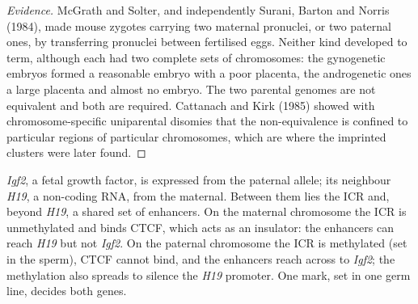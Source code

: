 \begin{proof}[Evidence]
McGrath and Solter, and independently Surani, Barton and Norris (1984),
made mouse zygotes carrying two maternal pronuclei, or two paternal
ones, by transferring pronuclei between fertilised eggs. Neither kind
developed to term, although each had two complete sets of chromosomes:
the gynogenetic embryos formed a reasonable embryo with a poor
placenta, the androgenetic ones a large placenta and almost no embryo.
The two parental genomes are not equivalent and both are required.
Cattanach and Kirk (1985) showed with chromosome-specific uniparental
disomies that the non-equivalence is confined to particular regions of
particular chromosomes, which are where the imprinted clusters were
later found.
\end{proof}

\begin{example}\label{ex:b3:chromatin-epigenetics:igf2}
\emph{Igf2}, a fetal growth factor, is expressed from the paternal
allele; its neighbour \emph{H19}, a non-coding RNA, from the maternal.
Between them lies the ICR and, beyond \emph{H19}, a shared set of
enhancers. On the maternal chromosome the ICR is unmethylated and binds
CTCF, which acts as an insulator: the enhancers can reach \emph{H19}
but not \emph{Igf2}. On the paternal chromosome the ICR is methylated
(set in the sperm), CTCF cannot bind, and the enhancers reach across to
\emph{Igf2}; the methylation also spreads to silence the \emph{H19}
promoter. One mark, set in one germ line, decides both genes.
\end{example}

